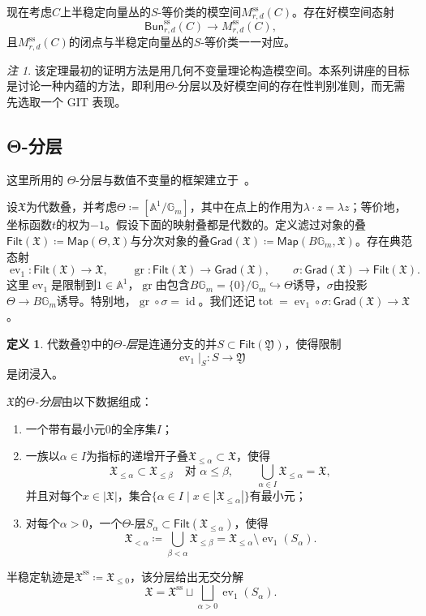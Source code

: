 \documentclass{amsart}
\theoremstyle{definition}
\newtheorem{defn}[thm]{定义}
\theoremstyle{remark}
\newtheorem{rmk}[thm]{注}
\theoremstyle{plain}
\theoremstyle{definition}
\theoremstyle{remark}
\newcommand{\A}{\mathbb{A}}
\newcommand{\G}{\mathbb{G}}
\newcommand{\mf}[1]{\mathfrak{#1}}
\newcommand{\mr}[1]{\mathrm{#1}}
\newcommand{\on}[1]{\operatorname{#1}}
\newcommand{\ms}[1]{\mathsf{#1}}
\newcommand{\1}{\mathbf{1}}
\newcommand{\2}{\mathbf{2}}
\newcommand{\3}{\mathbf{3}}
\DeclareMathOperator{\ev}{ev}
\begin{document}
现在考虑\(C\)上半稳定向量丛的\(S\)-等价类的模空间\(M_{r,d}^{\mr{ss}}(C)\)。存在好模空间态射
\[
    \ms{Bun}_{r,d}^{\mr{ss}}(C)\longrightarrow M_{r,d}^{\mr{ss}}(C),
\]
且\(M_{r,d}^{\mr{ss}}(C)\)的闭点与半稳定向量丛的\(S\)-等价类一一对应。

\begin{rmk}
    该定理最初的证明方法是用几何不变量理论构造模空间。本系列讲座的目标是讨论一种内蕴的方法，即利用\(\Theta\)-分层以及好模空间的存在性判别准则，而无需先选取一个 GIT 表现。
\end{rmk}


\subsection{Θ-分层}%
\label{sub:Theta-stratifications}

这里所用的 \(\Theta\)-分层与数值不变量的框架建立于~\cite{HLinstability}。

设\(\mf{X}\)为代数叠，并考虑\(\Theta\coloneqq[\A^1/\G_m]\)，其中在点上的作用为\(\lambda\cdot z=\lambda z\)；等价地，坐标函数\(t\)的权为\(-1\)。假设下面的映射叠都是代数的。定义滤过对象的叠\(\ms{Filt}(\mf{X})\coloneqq\ms{Map}(\Theta,\mf{X})\)与分次对象的叠\(\ms{Grad}(\mf{X})\coloneqq\ms{Map}(B\G_m,\mf{X})\)。存在典范态射
\[
    \ev_1\colon\ms{Filt}(\mf{X})\to\mf{X},
    \qquad
    \on{gr}\colon\ms{Filt}(\mf{X})\to\ms{Grad}(\mf{X}),
    \qquad
    \sigma\colon\ms{Grad}(\mf{X})\to\ms{Filt}(\mf{X}).
\]
这里\(\ev_1\)是限制到\(1\in\A^1\)，\(\on{gr}\)由包含\(B\G_m=\{0\}/\G_m\hookrightarrow\Theta\)诱导，\(\sigma\)由投影\(\Theta\to B\G_m\)诱导。特别地，\(\on{gr}\circ\sigma=\on{id}\)。我们还记\(\on{tot}=\ev_1\circ\sigma\colon\ms{Grad}(\mf{X})\to\mf{X}\)。

\begin{defn}
    代数叠\(\mf{Y}\)中的\textit{\(\Theta\)-层}是连通分支的并\(S\subset\ms{Filt}(\mf{Y})\)，使得限制
    \[
        \ev_1|_S\colon S\longrightarrow\mf{Y}
    \]
    是闭浸入。

    \(\mf{X}\)的\textit{\(\Theta\)-分层}由以下数据组成：
    \begin{enumerate}
        \item 一个带有最小元\(0\)的全序集\(I\)；
        \item 一族以\(\alpha\in I\)为指标的递增开子叠\(\mf{X}_{\leq\alpha}\subset\mf{X}\)，使得
        \[
            \mf{X}_{\leq\alpha}\subset\mf{X}_{\leq\beta}
            \quad\text{对 }\alpha\leq\beta,
            \qquad
            \bigcup_{\alpha\in I}\mf{X}_{\leq\alpha}=\mf{X},
        \]
        并且对每个\(x\in|\mf{X}|\)，集合\(\{\alpha\in I\mid x\in|\mf{X}_{\leq\alpha}|\}\)有最小元；
        \item 对每个\(\alpha>0\)，一个\(\Theta\)-层\(S_\alpha\subset\ms{Filt}(\mf{X}_{\leq\alpha})\)，使得
        \[
            \mf{X}_{<\alpha}
            \coloneqq
            \bigcup_{\beta<\alpha}\mf{X}_{\leq\beta}
            =
            \mf{X}_{\leq\alpha}\setminus\ev_1(S_\alpha).
        \]
    \end{enumerate}
    半稳定轨迹是\(\mf{X}^{\mr{ss}}\coloneqq\mf{X}_{\leq0}\)，该分层给出无交分解
    \[
        \mf{X}
        =
        \mf{X}^{\mr{ss}}
        \sqcup
        \bigsqcup_{\alpha>0}\ev_1(S_\alpha).
    \]
\end{defn}
\end{document}

